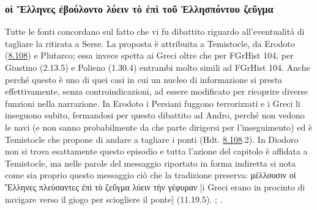 {\subsubsection{\textgreek{οἱ Ἕλληνες ἐβούλοντο λύειν τὸ ἐπὶ τοῦ Ἑλλησπόντου ζεῦγμα}}
Tutte le fonti concordano sul fatto che vi fu dibattito riguardo all'eventualità di tagliare la ritirata a Serse. La proposta è attribuita a Temistocle, da Erodoto (\href{http://data.perseus.org/citations/urn:cts:greekLit:tlg0016.tlg001.perseus-grc1:8.108}{8.108}) e Plutarco; essa invece spetta ai Greci oltre che per FGrHist 104, per  Giustino (2.13.5) e Polieno (1.30.4) entrambi molto simili ad FGrHist 104. Anche perché questo è uno di quei casi in cui un nucleo di informazione si presta effettivamente, senza controindicazioni, ad essere modificato per ricoprire diverse funzioni nella narrazione. In Erodoto i Persiani fuggono terrorizzati e i Greci li inseguono subito, fermandosi per questo dibattito ad Andro, perché non vedono le navi (e non sanno probabilmente da che parte dirigersi per l'inseguimento) ed è Temistocle che propone di andare a tagliare i ponti (Hdt. \href{http://data.perseus.org/citations/urn:cts:greekLit:tlg0016.tlg001.perseus-grc1:8.108}{8.108}.2). In  Diodoro non si trova esattamente questo episodio e tutta l'azione del capitolo è affidata a Temistocle, ma nelle parole del messaggio riportato in forma indiretta si nota come sia proprio questo messaggio ciò che la tradizione preserva: \textgreek{μέλλουσιν οἱ Ἕλληνες πλεύσαντες ἐπὶ τὸ ζεῦγμα λύειν τὴν γέφυραν} [i Greci erano in procinto di navigare verso il giogo per sciogliere il ponte] (11.19.5). \cite{Tuci2007}; \cite[289s]{Baragwanath2008}.
}
